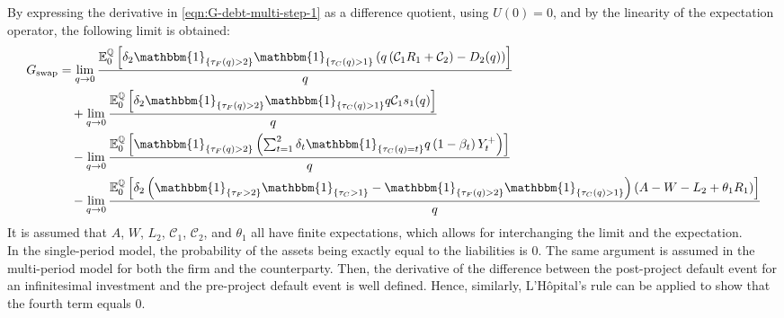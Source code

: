 \documentclass[main.tex]{subfiles}
\begin{document}
        By expressing the derivative in \cref{eqn:G-debt-multi-step-1} 
        as a difference quotient, using $U(0)=0$,
        and by the linearity of the expectation operator,
        the following limit is obtained:
        \begin{align}
            G_{\text{swap}} 
            &=
            \lim_{q \rightarrow 0}
            \frac{
                \mathbb{E}_{0}^{\rnmeasure}\left[
                    \delta_{2} \mathbbm{1}_{\{\tau_{F}(q)>2\}} \mathbbm{1}_{\{\tau_{C}(q)>1\}}
                    \left(
                        q\left(\mathcal{C}_{1} R_{1} + \mathcal{C}_{2}\right)
                        - D_{2}(q)
                    \right)
                \right]
            }{
                q
            }
            \nonumber
            \\
            &\quad+
            \lim_{q \rightarrow 0}
            \frac{
                \mathbb{E}_{0}^{\rnmeasure}\left[
                    \delta_2 \mathbbm{1}_{\{\tau_{F}(q)>2\}} \mathbbm{1}_{\{\tau_{C}(q)>1\}}
                    q\mathcal{C}_{1} s_1(q)
                \right]
            }{
                q
            }
            \nonumber
            \\
            &\quad-
            \lim_{q \rightarrow 0}
            \frac{
                \mathbb{E}_{0}^{\rnmeasure}\left[
                    \mathbbm{1}_{\{\tau_{F}(q)>2\}}
                    \left(
                        \sum_{t=1}^{2} \delta_{t} \mathbbm{1}_{\{\tau_{C}(q)=t\}}q\left(1-\beta_t\right)Y_{t}^{+}
                    \right)
                \right]
            }{
                q
            }
            \nonumber
            \\
            &\quad-
            \lim_{q \rightarrow 0}
            \frac{
                \mathbb{E}_{0}^{\rnmeasure}\left[
                    \delta_{2} \left(
                    \mathbbm{1}_{\{\tau_{F}>2\}} \mathbbm{1}_{\{\tau_{C}>1\}} - \mathbbm{1}_{\{\tau_{F}(q)>2\}} \mathbbm{1}_{\{\tau_{C}(q)>1\}}\right)
                    \left(
                        A - W
                        - L_{2}
                        + \theta_{1}R_{1}
                    \right)
                \right]
            }{
                q
            }
            \label{eqn:G-debt-multi-step-2}
        \end{align}
        It is assumed that $A$, $W$, $L_{2}$, $\mathcal{C}_1$, $\mathcal{C}_2$, and $\theta_1$ all have finite expectations,
        which allows for interchanging the limit and the expectation.
        \\
        In the single-period model, the probability of the assets being exactly equal to the liabilities is 0.
        The same argument is assumed in the multi-period model for both the firm and the counterparty.
        Then, the derivative of the difference between 
        the post-project default event for an infinitesimal investment
        and the pre-project default event is well defined.
        Hence, similarly, 
        L'H\^{o}pital's %
        rule can be applied to show that the fourth term equals 0.
        
\end{document}
